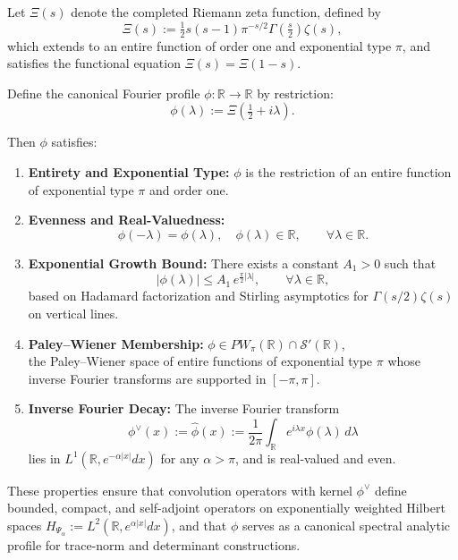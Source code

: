\begin{definition}
\label{def:canonical-fourier-profile}
Let \( \Xi(s) \) denote the completed Riemann zeta function, defined by
\[
\Xi(s) := \tfrac{1}{2} s(s-1) \pi^{-s/2} \Gamma\left(\tfrac{s}{2}\right) \zeta(s),
\]
which extends to an entire function of order one and exponential type \( \pi \), and satisfies the functional equation \( \Xi(s) = \Xi(1 - s) \).

Define the canonical Fourier profile \( \phi : \mathbb{R} \to \mathbb{R} \) by restriction:
\[
\phi(\lambda) := \Xi\left( \tfrac{1}{2} + i\lambda \right).
\]

Then \( \phi \) satisfies:
\begin{enumerate}
  \item \textbf{Entirety and Exponential Type:} \( \phi \) is the restriction of an entire function of exponential type \( \pi \) and order one.

  \item \textbf{Evenness and Real-Valuedness:}
  \[
  \phi(-\lambda) = \phi(\lambda), \quad \phi(\lambda) \in \mathbb{R}, \qquad \forall \lambda \in \mathbb{R}.
  \]

  \item \textbf{Exponential Growth Bound:} There exists a constant \( A_1 > 0 \) such that
  \[
  |\phi(\lambda)| \le A_1\, e^{\frac{\pi}{2} |\lambda|}, \qquad \forall \lambda \in \mathbb{R},
  \]
  based on Hadamard factorization and Stirling asymptotics for \( \Gamma(s/2) \zeta(s) \) on vertical lines.

  \item \textbf{Paley--Wiener Membership:}
\( \phi \in PW_\pi(\mathbb{R}) \cap \mathcal{S}'(\mathbb{R}) \),\\
the Paley--Wiener space of entire functions of exponential type \( \pi \)
whose inverse Fourier transforms are supported in \( [-\pi, \pi] \).

  \item \textbf{Inverse Fourier Decay:} The inverse Fourier transform
  \[
  \phi^\vee(x) := \widehat{\phi}(x) := \frac{1}{2\pi} \int_{\mathbb{R}} e^{i \lambda x} \phi(\lambda)\, d\lambda
  \]
  lies in \( L^1(\mathbb{R}, e^{-\alpha |x|} dx) \) for any \( \alpha > \pi \), and is real-valued and even.
\end{enumerate}

\noindent
These properties ensure that convolution operators with kernel \( \phi^\vee \) define bounded, compact, and self-adjoint operators on exponentially weighted Hilbert spaces \( H_{\Psi_\alpha} := L^2(\mathbb{R}, e^{\alpha |x|} dx) \), and that \( \phi \) serves as a canonical spectral analytic profile for trace-norm and determinant constructions.
\end{definition}
% 